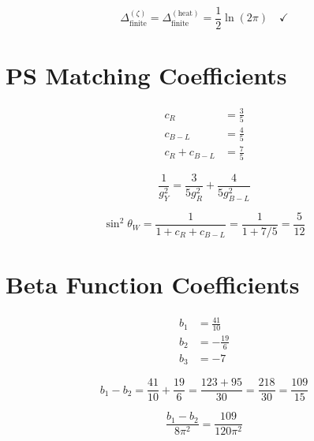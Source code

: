 \documentclass[11pt,a4paper]{article}
\theoremstyle{definition}
\begin{document}
\begin{equation}
\label{eq:reg_match}
\Delta_{\text{finite}}^{(\zeta)} = \Delta_{\text{finite}}^{(\text{heat})} = \frac{1}{2}\ln(2\pi) \quad \checkmark
\end{equation}

\section{PS Matching Coefficients}
\label{app:ps_matching}

\begin{align}
\label{eq:ps_c_R}
c_R &= \frac{3}{5} \\
\label{eq:ps_c_BL}
c_{B-L} &= \frac{4}{5} \\
\label{eq:ps_sum}
c_R + c_{B-L} &= \frac{7}{5}
\end{align}

\begin{equation}
\label{eq:gY_matching}
\frac{1}{g_Y^2} = \frac{3}{5g_R^2} + \frac{4}{5g_{B-L}^2}
\end{equation}

\begin{equation}
\label{eq:sw2_from_matching}
\sin^2\theta_W = \frac{1}{1 + c_R + c_{B-L}} = \frac{1}{1 + 7/5} = \frac{5}{12}
\end{equation}

\section{Beta Function Coefficients}
\label{app:beta}

\begin{align}
\label{eq:beta_b1}
b_1 &= \frac{41}{10} \\
\label{eq:beta_b2}
b_2 &= -\frac{19}{6} \\
\label{eq:beta_b3}
b_3 &= -7
\end{align}

\begin{equation}
\label{eq:beta_diff}
b_1 - b_2 = \frac{41}{10} + \frac{19}{6} = \frac{123 + 95}{30} = \frac{218}{30} = \frac{109}{15}
\end{equation}

\begin{equation}
\label{eq:RG_coeff}
\frac{b_1 - b_2}{8\pi^2} = \frac{109}{120\pi^2}
\end{equation}
\end{document}
